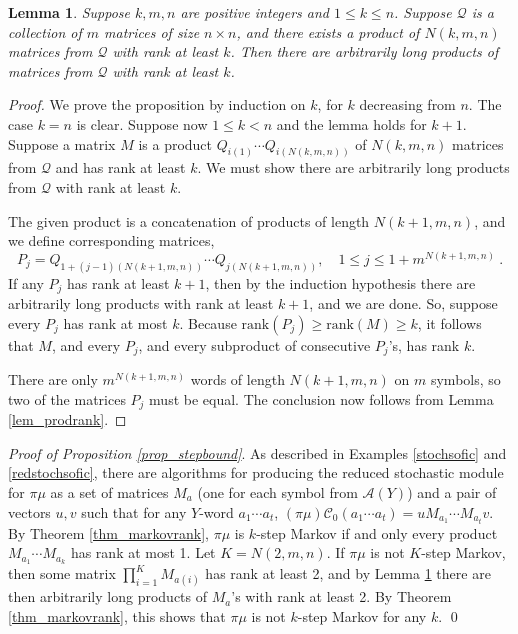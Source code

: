 \documentclass{kepart2010}
\theoremstyle{plain}
\newtheorem{lem}[thm]{Lemma}
\theoremstyle{definition}
\theoremstyle{remark}
\theoremstyle{definition}
\numberwithin{equation}{section}
\begin{document}
\begin{lem}\label{lem_boundrank}
Suppose  $k,m,n$ are positive integers and $1\leq k \leq n$.
Suppose $\mathcal Q$ is a collection of $m$ matrices of size
$n \times n$,
 and there exists a product  of  $N(k,m,n)$  matrices
from $\mathcal Q$ with rank at least $k$.
Then there are arbitrarily long products of matrices from
$\mathcal Q$ with rank
at least $k$.
\end{lem}
\begin{proof}

We prove the proposition by induction on $k$, for $k$ decreasing
from $n$. The case $k=n$ is clear. Suppose now $1\leq k < n$ and
the lemma holds for $k+1$.
Suppose a matrix $M$ is
a  product  $Q_{i(1)}\cdots Q_{i(N(k,m,n))}$
of $N(k,m,n)$ matrices from $\mathcal Q$ and has rank
at least $k$. We must show there are arbitrarily long products
from $\mathcal Q$ with rank at least $k$.

The given product is a concatenation of products of length
 $N(k+1,m,n)$, and we define corresponding matrices,
\begin{equation}
P_j = Q_{1+ (j-1)(N(k+1,m,n))}  \cdots Q_{j(N(k+1,m,n))}  ,
\quad 1\leq j \leq 1+m^{N(k+1,m,n)} \ .
\end{equation}
If any $P_j$ has
rank at least $k+1$, then by the induction hypothesis there
are arbitrarily long products with rank at least $k+1$, and
we are done. So, suppose every $P_j$
 has rank at most $k$. Because
$\text{rank}(P_j)\geq \text{rank}(M) \geq k$,
 it follows that $M$, and every $P_j$,
and every subproduct of consecutive $P_j$'s, has
 rank $k$.

There are only $m^{N(k+1,m,n)}$ words of length $N(k+1,m,n)$
on $m$ symbols, so two of the matrices $P_j$ must be equal.
The conclusion now follows from Lemma \ref{lem_prodrank}.
\end{proof}

 {\em Proof of Proposition \ref{prop_stepbound}}.
As described in Examples \ref{stochsofic} and \ref{redstochsofic},
there are algorithms for producing the reduced stochastic module for
$\pi \mu$ as a set of matrices $M_a$ (one for each symbol from
$\mathcal A(Y)$) and a pair of vectors $u,v$ such that for any
$Y$-word $a_1\cdots a_t$, $(\pi \mu) \mathcal C_0 (a_1\cdots a_t)=
uM_{a_1}\cdots M_{a_t}v$. By  Theorem \ref{thm_markovrank},
 $\pi \mu$ is $k$-step Markov if and only
every product $M_{a_1}\cdots M_{a_k}$ has rank at most 1.
Let $K=N(2,m,n)$.
If $\pi \mu$ is not $K$-step Markov,
then some matrix $\prod_{i=1}^KM_{a(i)} $
has rank at least 2, and by Lemma \ref{lem_boundrank}
there are then arbitrarily long products of $M_a$'s with
rank at least 2. By  Theorem \ref{thm_markovrank},
this shows that
$\pi \mu$ is not $k$-step Markov for any $k$.
 \qed
\end{document}
